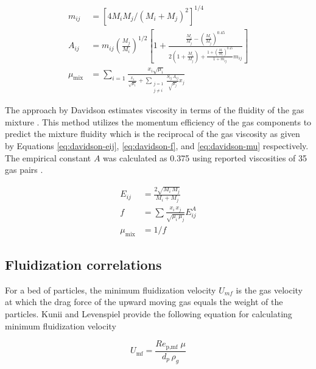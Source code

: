 \begin{align}
    m_{ij} &= \left[ 4 M_i M_j / (M_i + M_j)^2 \right]^{1/4} \label{eq:brokaw-mij} \\
    A_{ij} &= m_{ij}\left( \frac{M_j}{M_i} \right)^{1/2} \left[ 1 + \frac{\frac{M_i}{M_j} - \left(\frac{M_i}{M_j} \right)^{0.45} }{ 2 \left(1 + \frac{M_i}{M_j} \right) + \frac{1 + \left(\frac{M_i}{M_j} \right)^{0.45}}{1 + m_{ij}} m_{ij}} \right] \label{eq:brokaw-aij} \\
    \mu_{\text{mix}} &= \sum_{i=1} \frac{x_i \sqrt{\mu_i}}{\frac{x_i}{\sqrt{\mu_i}} + \sum_{\substack{j=1 \\ j \neq i}} \frac{S_{ij} \, A_{ij}}{\sqrt{\mu_j}} x_j} \label{eq:brokaw-mu}
\end{align}

The approach by Davidson estimates viscosity in terms of the fluidity of the gas mixture \cite{Davidson-1993}. This method utilizes the momentum efficiency of the gas components to predict the mixture fluidity which is the reciprocal of the gas viscosity as given by Equations \ref{eq:davidson-eij}, \ref{eq:davidson-f}, and \ref{eq:davidson-mu} respectively. The empirical constant $A$ was calculated as 0.375 using reported viscosities of 35 gas pairs \cite{Davidson-1993}.

\begin{align}
    E_{ij} &= \frac{2 \sqrt{M_i\, M_j}}{M_i + M_j} \label{eq:davidson-eij} \\
    f &= \sum \frac{x_i\, x_j}{\sqrt{\mu_i\, \mu_j}} E_{ij}^A \label{eq:davidson-f} \\
    \mu_\text{mix} &= 1 / f \label{eq:davidson-mu}
\end{align}


\subsection{Fluidization correlations}

For a bed of particles, the minimum fluidization velocity $U_{mf}$ is the gas velocity at which the drag force of the upward moving gas equals the weight of the particles. Kunii and Levenspiel \cite{Levenspiel-1991} provide the following equation for calculating minimum fluidization velocity

\begin{equation}
    U_\text{mf} = \frac{Re_\text{p,mf}\; \mu}{d_p\, \rho_g}
\end{equation}

